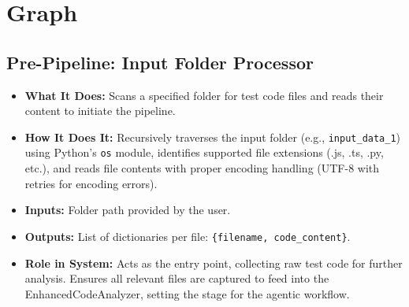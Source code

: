 \documentclass{article}
\begin{document}
\section{Graph}

\subsection{Pre-Pipeline: Input Folder Processor}
\begin{itemize}
    \item \textbf{What It Does:} Scans a specified folder for test code files and reads their content to initiate the pipeline.
    \item \textbf{How It Does It:} Recursively traverses the input folder (e.g., \texttt{input\_data\_1}) using Python's \texttt{os} module, identifies supported file extensions (.js, .ts, .py, etc.), and reads file contents with proper encoding handling (UTF-8 with retries for encoding errors).
    \item \textbf{Inputs:} Folder path provided by the user.
    \item \textbf{Outputs:} List of dictionaries per file: \texttt{\{filename, code\_content\}}.
    \item \textbf{Role in System:} Acts as the entry point, collecting raw test code for further analysis. Ensures all relevant files are captured to feed into the EnhancedCodeAnalyzer, setting the stage for the agentic workflow.
\end{itemize}
\end{document}
